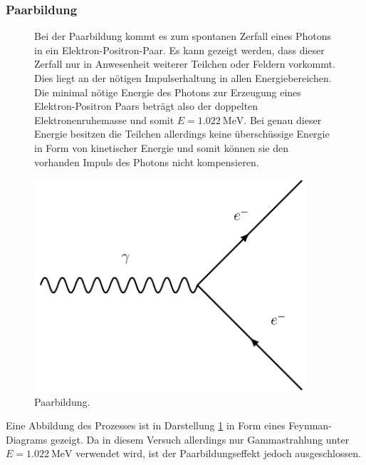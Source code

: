 \subsubsection{Paarbildung}
\begin{figure}
    \begin{minipage}{0.5\textwidth}
        Bei der Paarbildung kommt es zum spontanen Zerfall eines Photons in ein Elektron-Positron-Paar. Es kann gezeigt werden, dass dieser Zerfall nur in Anwesenheit weiterer Teilchen oder Feldern vorkommt. Dies liegt an der nötigen
        Impulserhaltung in allen Energiebereichen. Die minimal nötige Energie des Photons zur Erzeugung eines Elektron-Positron Paars beträgt also der doppelten Elektronenruhemasse und somit $E = \SI{1.022}{\mega\electronvolt}$. Bei genau dieser
        Energie besitzen die Teilchen allerdings keine überschüssige Energie in Form von kinetischer Energie und somit können sie den vorhanden Impuls des Photons nicht kompensieren.
    \end{minipage}
    \begin{minipage}{0.5\textwidth}
        \centering
        \includegraphics[width=0.9\textwidth]{bilder/paarbildung.pdf}
        \caption{Paarbildung.}
        \label{fig:lol1}
    \end{minipage}
    \end{figure}

Eine Abbildung des Prozesses ist in Darstellung \ref{fig:lol1} in Form eines
Feynman-Diagrams gezeigt. Da in diesem Versuch allerdings nur Gammastrahlung unter $E = \SI{1.022}{\mega\electronvolt}$ verwendet wird, ist der Paarbildungseffekt jedoch ausgeschlossen.
